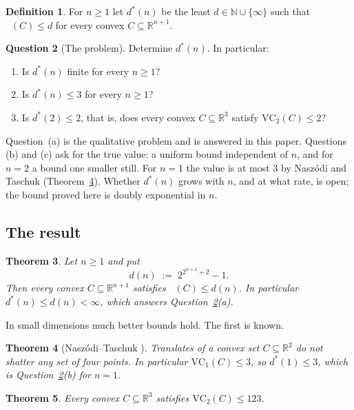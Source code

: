 \documentclass[11pt,a4paper]{article}
\theoremstyle{plain}
\newtheorem{theorem}{Theorem}[section]
\theoremstyle{definition}
\newtheorem{definition}[theorem]{Definition}
\newtheorem{question}[theorem]{Question}
\DeclareMathOperator{\VCn}{\mathrm{VC}_n}
\newcommand{\R}{\mathbb{R}}
\newcommand{\N}{\mathbb{N}}
\begin{document}
\begin{definition}\label{def:dstar}
For $n\ge1$ let $d^\ast(n)$ be the least $d\in\N\cup\{\infty\}$ such that
$\VCn(C)\le d$ for every convex $C\subseteq\R^{n+1}$.
\end{definition}

\begin{question}[The problem]\label{q:main}
Determine $d^\ast(n)$. In particular:
\begin{enumerate}
\item[(a)] Is $d^\ast(n)$ finite for every $n\ge1$?
\item[(b)] Is $d^\ast(n)\le3$ for every $n\ge1$?
\item[(c)] Is $d^\ast(2)\le2$, that is, does every convex $C\subseteq\R^3$ satisfy
$\mathrm{VC}_2(C)\le2$?
\end{enumerate}
\end{question}

Question~(a) is the qualitative problem and is answered in this paper. Questions (b) and (c) ask
for the true value: a uniform bound independent of $n$, and for $n=2$ a bound one smaller
still. For $n=1$ the value is at most $3$ by Naszódi and Taschuk (Theorem~\ref{thm:planar}). Whether $d^\ast(n)$ grows with $n$, and
at what rate, is open; the bound proved here is doubly exponential in $n$.

\subsection{The result}

\begin{theorem}\label{thm:main}
Let $n\ge1$ and put
\[
  d(n)\;:=\;2^{2^{n+1}+2}-1 .
\]
Then every convex $C\subseteq\R^{n+1}$ satisfies $\VCn(C)\le d(n)$. In
particular $d^\ast(n)\le d(n)<\infty$, which answers Question~\ref{q:main}(a).
\end{theorem}

In small dimensions much better bounds hold. The first is known.

\begin{theorem}[Naszódi--Taschuk {\cite[Theorem~3]{naszoditaschuk}}]\label{thm:planar}
Translates of a convex set $C\subseteq\R^{2}$ do not shatter any set of four points. In
particular $\mathrm{VC}_1(C)\le3$, so $d^\ast(1)\le3$, which is Question~\ref{q:main}(b) for $n=1$.
\end{theorem}

\begin{theorem}\label{thm:three}
Every convex $C\subseteq\R^{3}$ satisfies $\mathrm{VC}_2(C)\le123$.
\end{theorem}
\end{document}
